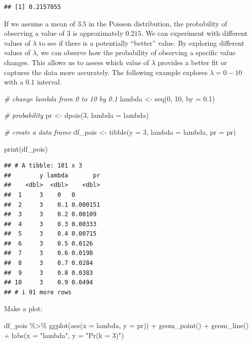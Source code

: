 \documentclass[
]{article}
\newenvironment{Shaded}{\begin{snugshade}}{\end{snugshade}}
\newcommand{\AttributeTok}[1]{\textcolor[rgb]{0.77,0.63,0.00}{#1}}
\newcommand{\CommentTok}[1]{\textcolor[rgb]{0.56,0.35,0.01}{\textit{#1}}}
\newcommand{\DecValTok}[1]{\textcolor[rgb]{0.00,0.00,0.81}{#1}}
\newcommand{\FloatTok}[1]{\textcolor[rgb]{0.00,0.00,0.81}{#1}}
\newcommand{\FunctionTok}[1]{\textcolor[rgb]{0.00,0.00,0.00}{#1}}
\newcommand{\NormalTok}[1]{#1}
\newcommand{\OtherTok}[1]{\textcolor[rgb]{0.56,0.35,0.01}{#1}}
\newcommand{\SpecialCharTok}[1]{\textcolor[rgb]{0.00,0.00,0.00}{#1}}
\newcommand{\StringTok}[1]{\textcolor[rgb]{0.31,0.60,0.02}{#1}}
\begin{document}
\begin{verbatim}
## [1] 0.2157855
\end{verbatim}

If we assume a mean of \(3.5\) in the Poisson distribution, the probability of observing a value of \(3\) is approximately \(0.215\). We can experiment with different values of \(\lambda\) to see if there is a potentially ``better'' value. By exploring different values of \(\lambda\), we can observe how the probability of observing a specific value changes. This allows us to assess which value of \(\lambda\) provides a better fit or captures the data more accurately. The following example explores \(\lambda = 0 - 10\) with a \(0.1\) interval.

\begin{Shaded}
\begin{Highlighting}[]
\CommentTok{\# change lambda from 0 to 10 by 0.1}
\NormalTok{lambda }\OtherTok{\textless{}{-}} \FunctionTok{seq}\NormalTok{(}\DecValTok{0}\NormalTok{, }\DecValTok{10}\NormalTok{, }\AttributeTok{by =} \FloatTok{0.1}\NormalTok{)}

\CommentTok{\# probability}
\NormalTok{pr }\OtherTok{\textless{}{-}} \FunctionTok{dpois}\NormalTok{(}\DecValTok{3}\NormalTok{, }\AttributeTok{lambda =}\NormalTok{ lambda)}

\CommentTok{\# create a data frame}
\NormalTok{df\_pois }\OtherTok{\textless{}{-}} \FunctionTok{tibble}\NormalTok{(}\AttributeTok{y =} \DecValTok{3}\NormalTok{,}
                  \AttributeTok{lambda =}\NormalTok{ lambda,}
                  \AttributeTok{pr =}\NormalTok{ pr)}

\FunctionTok{print}\NormalTok{(df\_pois)}
\end{Highlighting}
\end{Shaded}

\begin{verbatim}
## # A tibble: 101 x 3
##        y lambda       pr
##    <dbl>  <dbl>    <dbl>
##  1     3    0   0       
##  2     3    0.1 0.000151
##  3     3    0.2 0.00109 
##  4     3    0.3 0.00333 
##  5     3    0.4 0.00715 
##  6     3    0.5 0.0126  
##  7     3    0.6 0.0198  
##  8     3    0.7 0.0284  
##  9     3    0.8 0.0383  
## 10     3    0.9 0.0494  
## # i 91 more rows
\end{verbatim}

Make a plot:

\begin{Shaded}
\begin{Highlighting}[]
\NormalTok{df\_pois }\SpecialCharTok{\%\textgreater{}\%} 
  \FunctionTok{ggplot}\NormalTok{(}\FunctionTok{aes}\NormalTok{(}\AttributeTok{x =}\NormalTok{ lambda,}
             \AttributeTok{y =}\NormalTok{ pr)) }\SpecialCharTok{+}
  \FunctionTok{geom\_point}\NormalTok{() }\SpecialCharTok{+}
  \FunctionTok{geom\_line}\NormalTok{() }\SpecialCharTok{+}
  \FunctionTok{labs}\NormalTok{(}\AttributeTok{x =} \StringTok{"lambda"}\NormalTok{,}
       \AttributeTok{y =} \StringTok{"Pr(k = 3)"}\NormalTok{)}
\end{Highlighting}
\end{Shaded}
\end{document}
